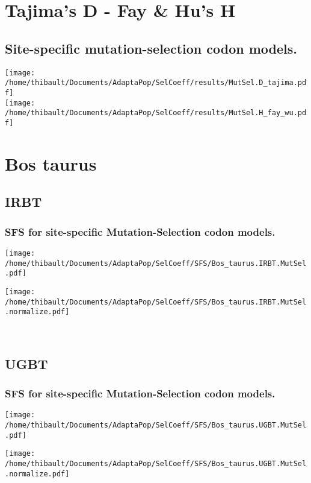 \section{Tajima's D - Fay \& Hu's H} 
 
\subsection{Site-specific mutation-selection codon models.} 
\begin{center}
\texttt{[image: /home/thibault/Documents/AdaptaPop/SelCoeff/results/MutSel.D\_tajima.pdf]} \\
\texttt{[image: /home/thibault/Documents/AdaptaPop/SelCoeff/results/MutSel.H\_fay\_wu.pdf]} \\
\end{center}
\section{Bos taurus} 
 
\subsection{IRBT} 
 
\subsubsection*{SFS for site-specific Mutation-Selection codon models.} 
\begin{minipage}{0.49\linewidth} 
\texttt{[image: /home/thibault/Documents/AdaptaPop/SelCoeff/SFS/Bos\_taurus.IRBT.MutSel.pdf]} 
\end{minipage}
\begin{minipage}{0.49\linewidth}
\texttt{[image: /home/thibault/Documents/AdaptaPop/SelCoeff/SFS/Bos\_taurus.IRBT.MutSel.normalize.pdf]} 
\end{minipage}
\\ 
\subsection{UGBT} 
 
\subsubsection*{SFS for site-specific Mutation-Selection codon models.} 
\begin{minipage}{0.49\linewidth} 
\texttt{[image: /home/thibault/Documents/AdaptaPop/SelCoeff/SFS/Bos\_taurus.UGBT.MutSel.pdf]} 
\end{minipage}
\begin{minipage}{0.49\linewidth}
\texttt{[image: /home/thibault/Documents/AdaptaPop/SelCoeff/SFS/Bos\_taurus.UGBT.MutSel.normalize.pdf]} 
\end{minipage}
\\ 
